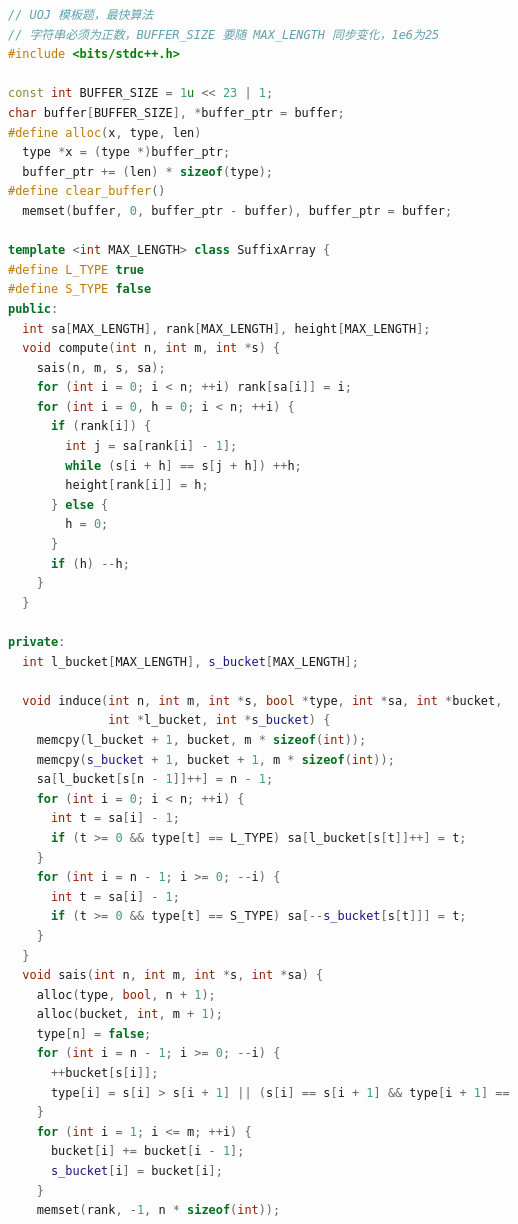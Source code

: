 \documentclass[twoside]{article}
\begin{document}
\begin{lstlisting}[language=c++]
// UOJ 模板题，最快算法
// 字符串必须为正数，BUFFER_SIZE 要随 MAX_LENGTH 同步变化，1e6为25
#include <bits/stdc++.h>

const int BUFFER_SIZE = 1u << 23 | 1;
char buffer[BUFFER_SIZE], *buffer_ptr = buffer;
#define alloc(x, type, len)                                                    \
  type *x = (type *)buffer_ptr;                                                \
  buffer_ptr += (len) * sizeof(type);
#define clear_buffer()                                                         \
  memset(buffer, 0, buffer_ptr - buffer), buffer_ptr = buffer;

template <int MAX_LENGTH> class SuffixArray {
#define L_TYPE true
#define S_TYPE false
public:
  int sa[MAX_LENGTH], rank[MAX_LENGTH], height[MAX_LENGTH];
  void compute(int n, int m, int *s) {
    sais(n, m, s, sa);
    for (int i = 0; i < n; ++i) rank[sa[i]] = i;
    for (int i = 0, h = 0; i < n; ++i) {
      if (rank[i]) {
        int j = sa[rank[i] - 1];
        while (s[i + h] == s[j + h]) ++h;
        height[rank[i]] = h;
      } else {
        h = 0;
      }
      if (h) --h;
    }
  }

private:
  int l_bucket[MAX_LENGTH], s_bucket[MAX_LENGTH];

  void induce(int n, int m, int *s, bool *type, int *sa, int *bucket,
              int *l_bucket, int *s_bucket) {
    memcpy(l_bucket + 1, bucket, m * sizeof(int));
    memcpy(s_bucket + 1, bucket + 1, m * sizeof(int));
    sa[l_bucket[s[n - 1]]++] = n - 1;
    for (int i = 0; i < n; ++i) {
      int t = sa[i] - 1;
      if (t >= 0 && type[t] == L_TYPE) sa[l_bucket[s[t]]++] = t;
    }
    for (int i = n - 1; i >= 0; --i) {
      int t = sa[i] - 1;
      if (t >= 0 && type[t] == S_TYPE) sa[--s_bucket[s[t]]] = t;
    }
  }
  void sais(int n, int m, int *s, int *sa) {
    alloc(type, bool, n + 1);
    alloc(bucket, int, m + 1);
    type[n] = false;
    for (int i = n - 1; i >= 0; --i) {
      ++bucket[s[i]];
      type[i] = s[i] > s[i + 1] || (s[i] == s[i + 1] && type[i + 1] == L_TYPE);
    }
    for (int i = 1; i <= m; ++i) {
      bucket[i] += bucket[i - 1];
      s_bucket[i] = bucket[i];
    }
    memset(rank, -1, n * sizeof(int));


\end{lstlisting}
\end{document}
